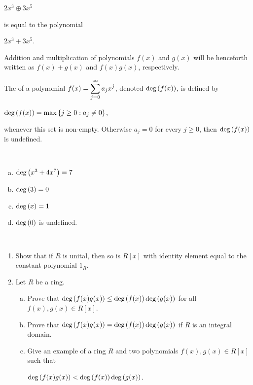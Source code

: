 \documentclass[11pt,fleqn,dvipsnames,usenames]{article}
\newcommand{\p}{\noindent}
\begin{document}
\begin{center}
$2x^3 \oplus 3x^5$
\end{center}

\p is equal to the polynomial

\begin{center}
$2x^3 + 3x^5$.
\end{center}

\p Addition and multiplication of polynomials $f(x)$ and $g(x)$ will be henceforth written as $f(x) + g(x)$ and $f(x)g(x)$, respectively.

%
\begin{definition} The  of a polynomial $f(x) = \displaystyle\sum\limits_{j=0}^{\infty}a_{j}x^{j}$, denoted $\text{deg}\left(f(x)\right)$, is defined by
\begin{center}
 $\text{deg}\left(f(x)\right) = \max \left\{j\geq 0:a_{j} \neq 0\right\}$,
 \end{center}
whenever this set is non-empty.  Otherwise $a_{j} = 0$ for every $j\geq 0$, then $\text{deg}\left(f(x)\right)$ is undefined.
\end{definition}
\newpage

\begin{examples}~
\begin{multicols}{2}
\begin{enumerate}[(a)]
\item $\text{deg}\left(x^3 + 4x^7\right) = 7$
\item $\text{deg}\left(3\right) = 0$
\item $\text{deg}\left(x\right) = 1$
\item $\text{deg}\left(0\right)$ is undefined.
\end{enumerate}
\end{multicols}
\end{examples}

\begin{exercises}\label{sumofdegreesexercises}~
\begin{enumerate}[1.]
\item Show that if $R$ is unital, then so is $R[x]$ with identity element equal to the constant polynomial $1_{R}$.
\item \label{sumofdegrees} Let $R$ be a ring.
\begin{enumerate}[(a)]
\item Prove that $\text{deg}\left(f(x)g(x)\right)\leq \text{deg}\left(f(x)\right)\text{deg}\left(g(x)\right)$ for all $f(x),g(x)\in R[x]$.
\item Prove that $\text{deg}\left(f(x)g(x)\right)= \text{deg}\left(f(x)\right)\text{deg}\left(g(x)\right)$ if $R$ is an integral domain.\label{sumofdegreesdomain}
\item Give an example of a ring $R$ and two polynomials $f(x),g(x)\in R[x]$ such that
\begin{center}
$\text{deg}\left(f(x)g(x)\right) < \text{deg}\left(f(x)\right)\text{deg}\left(g(x)\right)$.
\end{center}
\end{enumerate}
\end{enumerate}
\end{exercises}
\newpage
\end{document}
